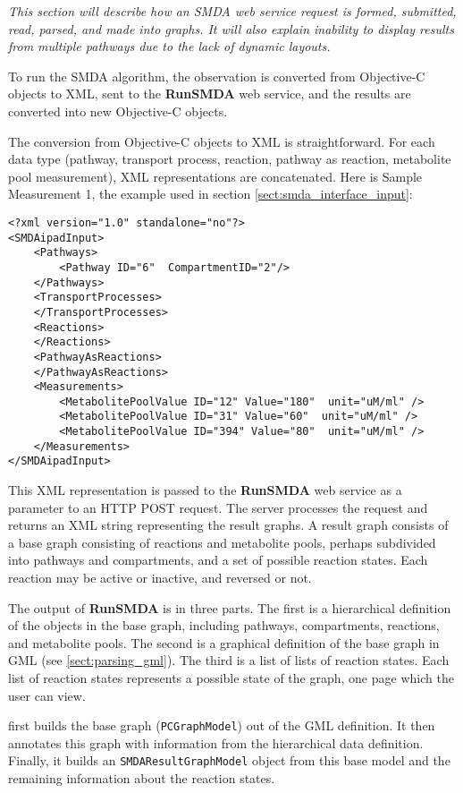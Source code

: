 \emph{This section will describe how an SMDA web service request is formed,
submitted, read, parsed, and made into graphs. It will also explain \mawappp
inability to display results from multiple pathways due to the lack of dynamic
layouts.}

To run the SMDA algorithm, the observation is converted from Objective-C objects
to XML, sent to the \textbf{RunSMDA} web service, and the results are converted
into new Objective-C objects.

The conversion from Objective-C objects to XML is straightforward. For each data
type (pathway, transport process, reaction, pathway as reaction, metabolite
pool measurement), XML representations are concatenated. Here is Sample
Measurement 1, the example used in section \ref{sect:smda_interface_input}:

\begin{lstlisting}
<?xml version="1.0" standalone="no"?>
<SMDAipadInput>
	<Pathways>
		<Pathway ID="6"  CompartmentID="2"/>		
	</Pathways>  
	<TransportProcesses>		
	</TransportProcesses>  
	<Reactions>		
	</Reactions>  	
	<PathwayAsReactions>
	</PathwayAsReactions>  	
	<Measurements>
		<MetabolitePoolValue ID="12" Value="180"  unit="uM/ml" />
		<MetabolitePoolValue ID="31" Value="60"  unit="uM/ml" />
		<MetabolitePoolValue ID="394" Value="80"  unit="uM/ml" />
	</Measurements>
</SMDAipadInput>
\end{lstlisting}

This XML representation is passed to the \textbf{RunSMDA} web service as a
parameter to an HTTP POST request. The server processes the request and returns
an XML string representing the result graphs. A result graph consists of a base
graph consisting of reactions and metabolite pools, perhaps subdivided into
pathways and compartments, and a set of possible reaction states. Each reaction
may be active or inactive, and reversed or not.

The output of \textbf{RunSMDA} is in three parts. The first is a hierarchical
definition of the objects in the base graph, including pathways, compartments,
reactions, and metabolite pools. The second is a graphical definition of the
base graph in GML (see \ref{sect:parsing_gml}). The third is a list of lists of
reaction states. Each list of reaction states represents a possible state of the
graph, one page which the user can view.

\mawapp first builds the base graph (\texttt{PCGraphModel}) out of the GML
definition. It then annotates this graph with information from the hierarchical
data definition. Finally, it builds an \texttt{SMDAResultGraphModel} object from
this base model and the remaining information about the reaction states.

